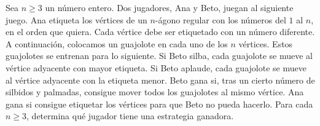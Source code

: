Sea $n\ge 3$ un número entero. Dos jugadores, Ana y Beto, juegan al siguiente juego. Ana etiqueta los vértices de un $n$-ágono regular con los números del $1$ al $n$, en el orden que quiera. Cada vértice debe ser etiquetado con un número diferente. A continuación, colocamos un guajolote en cada uno de los $n$ vértices. 
Estos guajolotes se entrenan para lo siguiente. Si Beto silba, cada guajolote se mueve al vértice adyacente con mayor etiqueta. Si Beto aplaude, cada guajolote se mueve al vértice adyacente con la etiqueta menor. 
Beto gana si, tras un cierto número de silbidos y palmadas, consigue mover todos los guajolotes al mismo vértice. Ana gana si consigue etiquetar los vértices para que Beto no pueda hacerlo. Para cada $n\ge 3$, determina qué jugador tiene una estrategia ganadora.
